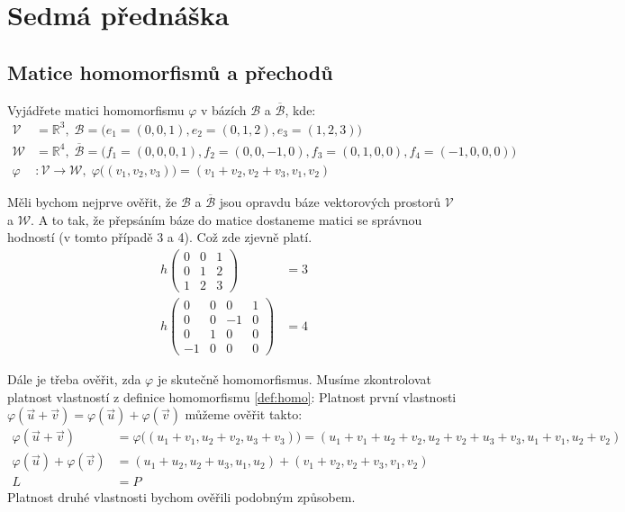 \section{Sedmá přednáška}

\subsection{Matice homomorfismů a přechodů}

\begin{example}
    \label{ex:homo_mat}
    Vyjádřete matici homomorfismu $\varphi$ v bázích $\mathcal{B}$ a $\overline{\mathcal{B}}$, kde:
    \begin{align*}
        \mathcal{V} &= \mathbb{R}^3,\;
        \mathcal{B} = \big (e_1 = (0, 0, 1), e_2 = (0, 1, 2), e_3 = (1, 2, 3)\big)\\
        \mathcal{W} &= \mathbb{R}^4,\;
        \overline{\mathcal{B}} = \big (f_1 = (0, 0, 0, 1), f_2 = (0, 0, -1, 0), f_3 = (0, 1, 0, 0), f_4 = (-1, 0, 0, 0)\big)\\
        \varphi &: \mathcal{V} \rightarrow \mathcal{W}, \;
        \varphi\big( (v_1, v_2, v_3) \big) = (v_1 + v_2, v_2 + v_3, v_1, v_2)
    \end{align*}

    Měli bychom nejprve ověřit, že $\mathcal{B}$ a $\overline{\mathcal{B}}$ jsou opravdu
    báze vektorových prostorů $\mathcal{V}$ a $\mathcal{W}$. A to tak, že přepsáním báze do
    matice dostaneme matici se správnou hodností (v tomto případě 3 a 4). Což zde zjevně platí.
    \begin{align*}
        h \begin{pmatrix}
            0 & 0 & 1\\
            0 & 1 & 2\\
            1 & 2 & 3
        \end{pmatrix} &= 3\\
        h \begin{pmatrix}
            0 & 0 & 0 & 1\\
            0 & 0 & -1 & 0\\
            0 & 1 & 0 & 0\\
            -1 & 0 & 0 & 0
        \end{pmatrix} &= 4
    \end{align*}

    Dále je třeba ověřit, zda $\varphi$ je skutečně homomorfismus. Musíme zkontrolovat platnost
    vlastností z definice homomorfismu \ref{def:homo}:
    Platnost první vlastnosti $\varphi(\vec{u} + \vec{v}) = \varphi(\vec{u}) + \varphi(\vec{v})$
    můžeme ověřit takto:
    \begin{align*}
        \varphi(\vec{u} + \vec{v}) &= \varphi\big ( (u_1 + v_1, u_2 + v_2, u_3 + v_3) \big) =
            (u_1 + v_1 + u_2 + v_2, u_2 + v_2 + u_3 + v_3, u_1 + v_1, u_2 + v_2)\\
        \varphi(\vec{u}) + \varphi(\vec{v}) &= (u_1 + u_2, u_2 + u_3, u_1, u_2) +
            (v_1 + v_2, v_2 + v_3, v_1, v_2) \\
            L &= P
    \end{align*}
    Platnost druhé vlastnosti bychom ověřili podobným způsobem.


\end{example}
